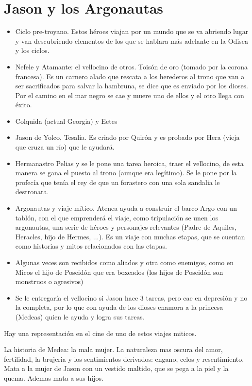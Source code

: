 \section{Jason y los Argonautas}
\begin{itemize}
    \item Ciclo pre-troyano. Estos héroes viajan por un mundo que se va abriendo lugar y van descubriendo elementos de los que se hablara más adelante en la Odisea y los ciclos.
    \item Nefele y Atamante: el vellocino de otros. Toisón de oro (tomado por la corona francesa). Es un carnero alado que rescata a los herederos al trono que van a ser sacrificados para salvar la hambruna, se dice que es enviado por los dioses. Por el camino en el mar negro se cae y muere uno de ellos y el otro llega con éxito.
    \item Colquida (actual Georgia) y Eetes 
    \item Jason de Yolco, Tesalia. Es criado por Quirón y es probado por Hera (vieja que cruza un río) que le ayudará.
    \item Hermanastro Pelias y se le pone una tarea heroica, traer el vellocino, de esta manera se gana el puesto al trono (aunque era legítimo). Se le pone por la profecía que tenía el rey de que un forastero con una sola sandalia le destronara.
    \item Argonautas y viaje mítico. Atenea ayuda a construir el barco Argo con un tablón, con el que emprenderá el viaje, como tripulación se unen los argonautas, una serie de héroes y personajes relevantes (Padre de Aquiles, Heracles, hijo de Hermes, ...). Es un viaje con muchas etapas, que se cuentan como historias y mitos relacionados con las etapas.
    \item Algunas veces son recibidos como aliados y otra como enemigos, como en Micos el hijo de Poseidón que era boxeados (los hijos de Poseidón son monstruos o agresivos)
    \item Se le entregaría el vellocino si Jason hace 3 tareas, pero cae en depresión y no la completa, por lo que con ayuda de los dioses enamora a la princesa (Medeas) quien le ayuda y logra sus tareas.
\end{itemize}

Hay una representación en el cine de uno de estos viajes miticos.

La historia de Medea: la mala mujer. La naturaleza mas oscura del amor, fertilidad, la brujeria y los sentimientos derivados: engano, celos y resentimiento. Mata a la mujer de Jason con un vestido maltido, que se pega a la piel y la quema. Ademas mata a sus hijos.

